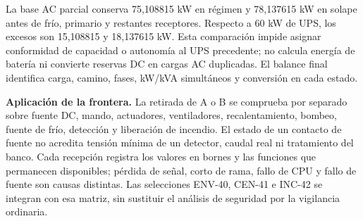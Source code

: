La base AC parcial conserva 75,108815 kW en régimen y 78,137615 kW en solape antes de frío, primario y restantes receptores. Respecto a 60 kW de UPS, los excesos son 15,108815 y 18,137615 kW. Esta comparación impide asignar conformidad de capacidad o autonomía al UPS precedente; no calcula energía de batería ni convierte reservas DC en cargas AC duplicadas. El balance final identifica carga, camino, fases, kW/kVA simultáneos y conversión en cada estado.

\textbf{Aplicación de la frontera.} La retirada de A o B se comprueba por separado sobre fuente DC, mando, actuadores, ventiladores, recalentamiento, bombeo, fuente de frío, detección y liberación de incendio. El estado de un contacto de fuente no acredita tensión mínima de un detector, caudal real ni tratamiento del banco. Cada recepción registra los valores en bornes y las funciones que permanecen disponibles; pérdida de señal, corto de rama, fallo de CPU y fallo de fuente son causas distintas. Las selecciones ENV-40, CEN-41 e INC-42 se integran con esa matriz, sin sustituir el análisis de seguridad por la vigilancia ordinaria.

